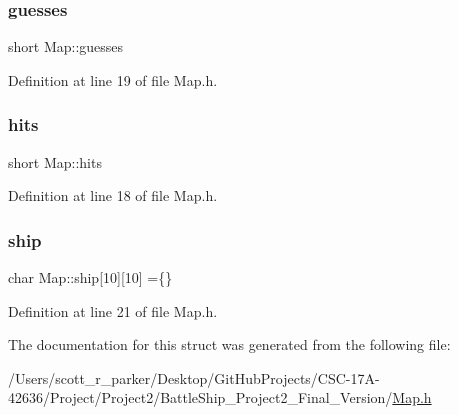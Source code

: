 \subsubsection{\texorpdfstring{guesses}{guesses}}
{\footnotesize\ttfamily short Map\+::guesses}



Definition at line 19 of file Map.\+h.

\mbox{\label{struct_map_a4b81caa9d402a8edc30fb93869e7163e}} 
\subsubsection{\texorpdfstring{hits}{hits}}
{\footnotesize\ttfamily short Map\+::hits}



Definition at line 18 of file Map.\+h.

\mbox{\label{struct_map_a95d68a52f9a8a7c50c45e9ef63fe9a64}} 
\subsubsection{\texorpdfstring{ship}{ship}}
{\footnotesize\ttfamily char Map\+::ship\mbox{[}10\mbox{]}\mbox{[}10\mbox{]} =\{\}}



Definition at line 21 of file Map.\+h.



The documentation for this struct was generated from the following file\+:\begin{DoxyCompactItemize}
\item 
/\+Users/scott\+\_\+r\+\_\+parker/\+Desktop/\+Git\+Hub\+Projects/\+C\+S\+C-\/17\+A-\/42636/\+Project/\+Project2/\+Battle\+Ship\+\_\+\+Project2\+\_\+\+Final\+\_\+\+Version/\hyperlink{_map_8h}{Map.\+h}\end{DoxyCompactItemize}
